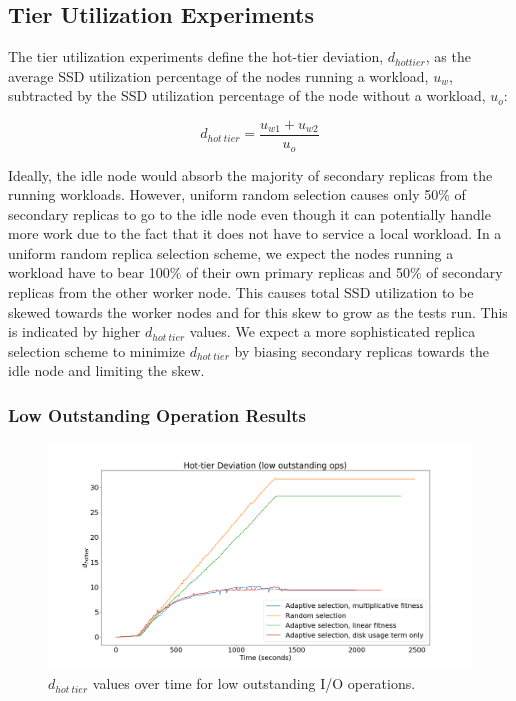\documentclass[12pt]{article}
\begin{document}
  \subsection{Tier Utilization Experiments}

  The tier utilization experiments define the hot-tier deviation,
  $d_{hot tier}$, as the average SSD utilization percentage of the nodes
  running a workload, $u_{w}$, subtracted by the SSD utilization percentage of
  the node without a workload, $u_{o}$:
  
  \begin{equation}
    d_{hot\ tier} = \frac{u_{w1} + u_{w2}}{u_{o}}
  \end{equation}
  
  Ideally, the idle node would absorb the majority of secondary replicas from
  the running workloads. However, uniform random selection causes only 50\% of
  secondary replicas to go to the idle node even though it can potentially
  handle more work due to the fact that it does not have to service a local
  workload. In a uniform random replica selection scheme, we expect the
  nodes running a workload have to bear 100\% of their own primary replicas and
  50\% of secondary replicas from the other worker node. This causes total SSD
  utilization to be skewed towards the worker nodes and for this skew to grow
  as the tests run. This is indicated by higher $d_{hot\ tier}$ values. We
  expect a more sophisticated replica selection scheme to minimize
  $d_{hot\ tier}$ by biasing secondary replicas towards the idle node and
  limiting the skew.


    \subsubsection{Low Outstanding Operation Results}

    \begin{figure}[h]
      \centering
      \includegraphics[scale=0.30]{images/low_outstanding_exp.png} 
      \caption{$d_{hot\ tier}$ values over time for low outstanding I/O
               operations.}
      \label{fig:low_outstanding_tier_disparity}
    \end{figure}
\end{document}
